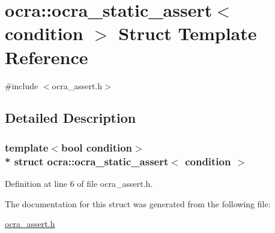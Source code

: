 \hypertarget{structocra_1_1ocra__static__assert}{}\section{ocra\+:\+:ocra\+\_\+static\+\_\+assert$<$ condition $>$ Struct Template Reference}
\label{structocra_1_1ocra__static__assert}


{\ttfamily \#include $<$ocra\+\_\+assert.\+h$>$}



\subsection{Detailed Description}
\subsubsection*{template$<$bool condition$>$\\*
struct ocra\+::ocra\+\_\+static\+\_\+assert$<$ condition $>$}



Definition at line 6 of file ocra\+\_\+assert.\+h.



The documentation for this struct was generated from the following file\+:\begin{DoxyCompactItemize}
\item 
\hyperlink{ocra__assert_8h}{ocra\+\_\+assert.\+h}\end{DoxyCompactItemize}
